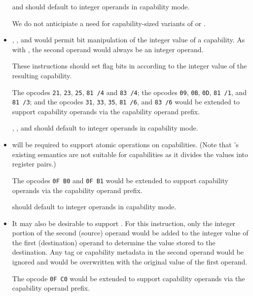\begin{itemize}
     and  should default to integer
    operands in capability mode.

    We do not anticipiate a need for capability-sized variants of
     or .

  \item {}, , and  would
    permit bit manipulation of the integer value of a capability.  As
    with , the second operand would always be an
    integer operand.

    These instructions should set flag bits in \RFLAGS{} according to
    the integer value of the resulting capability.

    The  opcodes \texttt{21}, \texttt{23}, \texttt{25},
    \texttt{81 /4} and \texttt{83 /4}; the  opcodes
    \texttt{09}, \texttt{0B}, \texttt{0D}, \texttt{81 /1}, and
    \texttt{81 /3}; and the  opcodes \texttt{31},
    \texttt{33}, \texttt{35}, \texttt{81 /6}, and \texttt{83 /6} would
    be extended to support capability operands via the capability
    operand prefix.

    , , and  should
    default to integer operands in capability mode.

  \item {} will be required to support atomic
    operations on capabilities.  (Note that 's
    existing semantics are not suitable for capabilities as it divides
    the values into register pairs.)

    The opcodes \texttt{0F B0} and \texttt{0F B1} would be extended to
    support capability operands via the capability operand prefix.

     should default to integer operands in
    capability mode.

  \item It may also be desirable to support .  For
    this instruction, only the integer portion of the second (source)
    operand would be added to the integer value of the first
    (destination) operand to determine the value stored to the
    destination.  Any tag or capability metadata in the second operand
    would be ignored and would be overwritten with the original value
    of the first operand.

    The opcode \texttt{0F C0} would be extended to support capability
    operands via the capability operand prefix.


\end{itemize}
